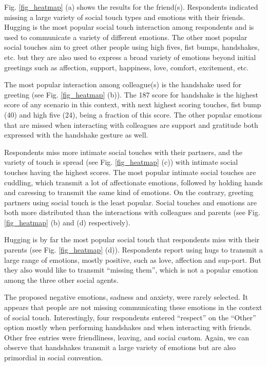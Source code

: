 \documentclass[acmsmall]{acmart}
\begin{document}
Fig. \ref{fig_heatmap} (a) shows the results for the friend(s). Respondents indicated missing a large variety of social touch types and emotions with their friends. Hugging is the most popular social touch interaction among respondents and is used to communicate a variety of different emotions. The other most popular social touches aim to greet other people using high fives, fist bumps, handshakes, etc. but they are also used to express a broad variety of emotions beyond initial greetings such as affection, support, happiness, love, comfort, excitement, etc.

The most popular interaction among colleague(s) is the handshake used for greeting (see Fig. \ref{fig_heatmap} (b)). The 187 score for handshake is the highest score of any scenario in this context, with next highest scoring touches, fist bump (40) and high five (24), being a fraction of this score. The other popular emotions that are missed when interacting with colleagues are support and gratitude both expressed with the handshake gesture as well.

Respondents miss more intimate social touches with their partners, and the variety of touch is spread (see Fig. \ref{fig_heatmap} (c)) with intimate social touches having the highest scores. The most popular intimate social touches are cuddling, which transmit a lot of affectionate emotions, followed by holding hands and caressing to transmit the same kind of emotions. On the contrary, greeting partners using social touch is the least popular. Social touches and emotions are both more distributed than the interactions with colleagues and parents (see Fig. \ref{fig_heatmap} (b) and (d) respectively). 

Hugging is by far the most popular social touch that respondents miss with their parents (see Fig. \ref{fig_heatmap} (d)). Respondents report using hugs to transmit a large range of emotions, mostly positive, such as love, affection and sup-port. But they also would like to transmit “missing them”, which is not a popular emotion among the three other social agents. 

The proposed negative emotions, sadness and anxiety, were rarely selected. It appears that people are not missing communicating these emotions in the context of social touch. 
Interestingly, four respondents entered “respect” on the “Other” option mostly when performing handshakes and when interacting with friends. Other free entries were friendliness, leaving, and social custom. Again, we can observe that handshakes transmit a large variety of emotions but are also primordial in social convention.
\end{document}
